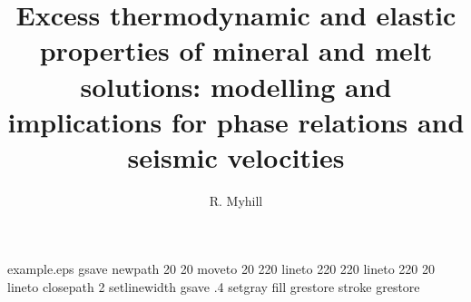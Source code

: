 %
%
%
%
%
\begin{filecontents*}{example.eps}
gsave
newpath
  20 20 moveto
  20 220 lineto
  220 220 lineto
  220 20 lineto
closepath
2 setlinewidth
gsave
  .4 setgray fill
grestore
stroke
grestore
\end{filecontents*}
%
\RequirePackage{fix-cm}
%
\documentclass[smallextended]{svjour3}       %
%
\smartqed  %
%
\usepackage{graphicx}
%
%
\usepackage{natbib}
%
%
%


\title{Excess thermodynamic and elastic properties of mineral and melt solutions: modelling and implications for phase relations and seismic velocities}


\author{R. Myhill}



